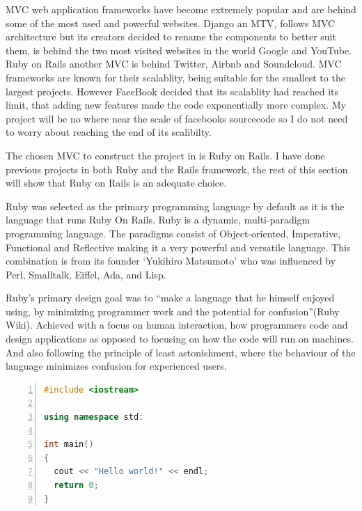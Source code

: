 \documentclass[a4paper,12pt]{article}
\begin{document}
\vspace{3mm}
\par MVC web application frameworks have become extremely popular and are behind some of the most used and powerful websites. Django an MTV, follows MVC architecture but its creators decided to rename the components \cite{Django} to better suit them, is behind the two most visited websites in the world Google and YouTube\cite{SHUUP}\cite{Alexa}. Ruby on Rails another MVC is behind Twitter, Airbnb and Soundcloud.\cite{Coderfactory} MVC frameworks are known for their scalablity, being suitable for the smallest to the largest projects. However FaceBook decided that its scalablity had reached its limit, that adding new features made the code exponentially more complex.\cite{Infoq} My project will be no where near the scale of facebooks sourcecode so I do not need to worry about reaching the end of its scalibilty.
\vspace{3mm}
\par The chosen MVC to construct the project in is Ruby on Rails. I have done previous projects in both Ruby and the Rails framework, the rest of this section will show that Ruby on Rails is an adequate choice.
\vspace{3mm}
\par Ruby was selected as the primary programming language by default as it is the language that runs Ruby On Rails. Ruby is a dynamic, multi-paradigm programming language. The paradigms consist of Object-oriented, Imperative, Functional and Reflective making it a very powerful and versatile language. This combination is from its founder ‘Yukihiro Matsumoto’ who was influenced by Perl, Smalltalk, Eiffel, Ada, and Lisp.
\vspace{3mm}
\par Ruby’s primary design goal was to “make a language that he himself enjoyed using, by minimizing programmer work and the potential for confusion”(Ruby Wiki). Achieved with a focus on human interaction, how programmers code and design applications as opposed to focusing on how the code will run on machines. And also following the principle of least astonishment, where the behaviour of the language minimizes confusion for experienced users.
\vspace{3mm}
\begin{lstlisting}[frame=single,numbers=left,language = C++,caption= {C++ print Hello world to console}, label={fig:c++print}]
#include <iostream>

using namespace std:

int main()
{
  cout << "Hello world!" << endl;
  return 0;
}
\end{lstlisting}
\end{document}
